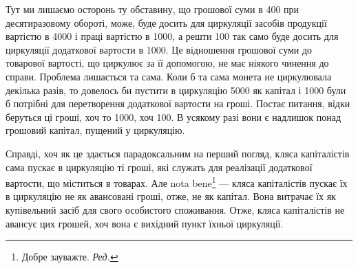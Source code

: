 
Тут ми лишаємо осторонь ту обставину, що грошової суми в 400 при десятиразовому обороті, може, буде досить для циркуляції
засобів продукції вартістю в 4000 і праці вартістю в 1000, а решти 100 так само буде досить для циркуляції додаткової
вартости в 1000. Це відношення грошової суми до товарової
вартості, що циркулює за її допомогою, не має ніякого чинення до
справи. Проблема лишається та сама. Коли б та сама монета не циркулювала
декілька разів, то довелось би пустити в циркуляцію 5000
як капітал і 1000 були б потрібні для перетворення додаткової
вартости на гроші. Постає питання, відки беруться ці гроші, хоч то
1000, хоч 100. В усякому разі вони є надлишок понад
грошовий капітал, пущений у циркуляцію.

Справді, хоч як це здається парадоксальним на перший погляд, кляса
капіталістів сама пускає в циркуляцію ті гроші, які служать для реалізації
додаткової вартости, що міститься в товарах. Але nota bene\footnote*{
Добре зауважте. \emph{Ред.}
} — кляса
капіталістів пускає їх в циркуляцію не як авансовані гроші, отже, не як
капітал. Вона витрачає їх як купівельний засіб для свого особистого
споживання. Отже, кляса капіталістів не авансує цих грошей, хоч вона
є вихідний пункт їхньої циркуляції.

